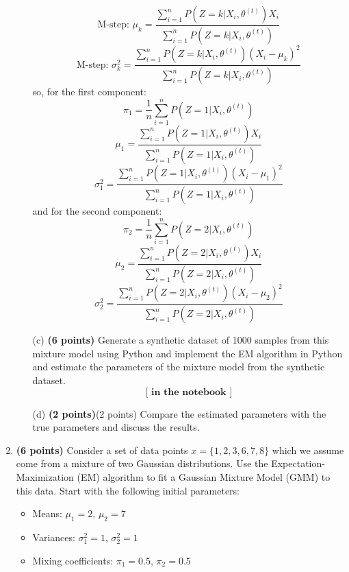 \documentclass{article}
\begin{document}
\begin{enumerate}
\begin{enumerate}
\[        \]
        \[
        \text{M-step: } \mu_k = \frac{\sum_{i=1}^{n} P(Z = k | X_i, \theta^{(t)}) X_i}{\sum_{i=1}^{n} P(Z = k | X_i, \theta^{(t)})}
        \]
        \[
        \text{M-step: } \sigma_k^2 = \frac{\sum_{i=1}^{n} P(Z = k | X_i, \theta^{(t)}) (X_i - \mu_k)^2}{\sum_{i=1}^{n} P(Z = k | X_i, \theta^{(t)})}
        \]
        so, for the first component:
        \[
        \pi_1 = \frac{1}{n} \sum_{i=1}^{n} P(Z = 1 | X_i, \theta^{(t)})
        \]
        \[
        \mu_1 = \frac{\sum_{i=1}^{n} P(Z = 1 | X_i, \theta^{(t)}) X_i}{\sum_{i=1}^{n} P(Z = 1 | X_i, \theta^{(t)})}
        \]
        \[
        \sigma_1^2 = \frac{\sum_{i=1}^{n} P(Z = 1 | X_i, \theta^{(t)}) (X_i - \mu_1)^2}{\sum_{i=1}^{n} P(Z = 1 | X_i, \theta^{(t)})}
        \]
        and for the second component:
        \[
        \pi_2 = \frac{1}{n} \sum_{i=1}^{n} P(Z = 2 | X_i, \theta^{(t)})
        \]
        \[
        \mu_2 = \frac{\sum_{i=1}^{n} P(Z = 2 | X_i, \theta^{(t)}) X_i}{\sum_{i=1}^{n} P(Z = 2 | X_i, \theta^{(t)})}
        \]
        \[
        \sigma_2^2 = \frac{\sum_{i=1}^{n} P(Z = 2 | X_i, \theta^{(t)}) (X_i - \mu_2)^2}{\sum_{i=1}^{n} P(Z = 2 | X_i, \theta^{(t)})}
        \]
        \item[(c)] \textbf{(6 points)} Generate a synthetic dataset of 1000 samples from this mixture model using Python and implement the EM algorithm in Python and estimate the parameters of the mixture model from the synthetic dataset.
        \[
            \textbf{[ in the notebook ]}
        \]
        \item[(d)] \textbf{(2 points)}(2 points) Compare the estimated parameters with the true parameters and discuss the results.
    \end{enumerate}
    
    \item \textbf{(6 points)} Consider a set of data points \(x = \{1, 2, 3, 6, 7, 8\}\) which we assume come from a mixture of two Gaussian distributions. Use the Expectation-Maximization (EM) algorithm to fit a Gaussian Mixture Model (GMM) to this data. Start with the following initial parameters:

    \begin{itemize}
        \item Means: \(\mu_1 = 2\), \(\mu_2 = 7\)
        \item Variances: \(\sigma_1^2 = 1\), \(\sigma_2^2 = 1\)
        \item Mixing coefficients: \(\pi_1 = 0.5\), \(\pi_2 = 0.5\)
    \end{itemize}


\end{enumerate}
\end{document}
